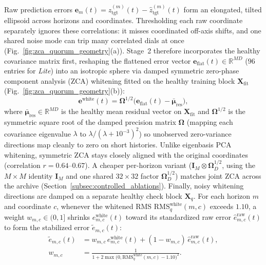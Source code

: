 \documentclass[journal]{IEEEtran}
\begin{document}
Raw prediction errors $\mathbf{e}_m(t) = z_{\text{tgt}}^{(m)}(t) - \hat{z}_{\text{tgt}}^{(m)}(t)$ form an elongated, tilted ellipsoid across horizons and coordinates. Thresholding each raw coordinate separately ignores these correlations: it misses coordinated off-axis shifts, and one shared noise mode can trip many correlated dials at once (Fig.~\ref{fig:zca_quorum_geometry}(a)). Stage~2 therefore incorporates the healthy covariance matrix first, reshaping the flattened error vector $\mathbf{e}_{\text{flat}}(t) \in \mathbb{R}^{MD}$ ($96$ entries for \emph{Lite}) into an isotropic sphere via damped symmetric zero-phase component analysis (ZCA) whitening fitted on the healthy training block $\mathbf{X}_{\text{fit}}$ (Fig.~\ref{fig:zca_quorum_geometry}(b)):
\begin{equation}
    \mathbf{e}^{\text{white}}(t) = \mathbf{\Omega}^{1/2}\bigl(\mathbf{e}_{\text{flat}}(t) - \bar{\bm{\mu}}_{\text{res}}\bigr),
\end{equation}
where $\bar{\bm{\mu}}_{\text{res}} \in \mathbb{R}^{MD}$ is the healthy mean residual vector on $\mathbf{X}_{\text{fit}}$ and $\mathbf{\Omega}^{1/2}$ is the symmetric square root of the damped precision matrix $\mathbf{\Omega}$ (mapping each covariance eigenvalue $\lambda$ to $\lambda/(\lambda+10^{-3})^2$) so unobserved zero-variance directions map cleanly to zero on short histories. Unlike eigenbasis PCA whitening, symmetric ZCA stays closely aligned with the original coordinates (correlation $r=0.64\text{--}0.67$). A cheaper per-horizon variant ($\mathbf{I}_M\otimes\mathbf{\Omega}_D^{1/2}$, using the $M\times M$ identity $\mathbf{I}_M$ and one shared $32\times 32$ factor $\mathbf{\Omega}_D^{1/2}$) matches joint ZCA across the archive (Section~\ref{subsec:controlled_ablations}). Finally, noisy whitening directions are damped on a separate healthy check block $\mathbf{X}_q$. For each horizon $m$ and coordinate $c$, whenever the whitened RMS $\text{RMS}_{q}^{\text{white}}(m,c)$ exceeds $1.10$, a weight $w_{m,c}\in(0,1]$ shrinks $e_{m,c}^{\text{white}}(t)$ toward its standardized raw error $\hat{e}_{m,c}^{\text{raw}}(t)$ to form the stabilized error $\tilde{e}_{m,c}(t)$:
\begin{equation}
\begin{aligned}
    \tilde{e}_{m,c}(t) &= w_{m,c}\,e_{m,c}^{\text{white}}(t) + (1 - w_{m,c})\,\hat{e}_{m,c}^{\text{raw}}(t), \\
    w_{m,c} &= \frac{1}{1 + 2\max\bigl(0, \text{RMS}_{q}^{\text{white}}(m,c) - 1.10\bigr)^2}.
\end{aligned}
\label{eq:stabilized_whitening}
\end{equation}
\end{document}
